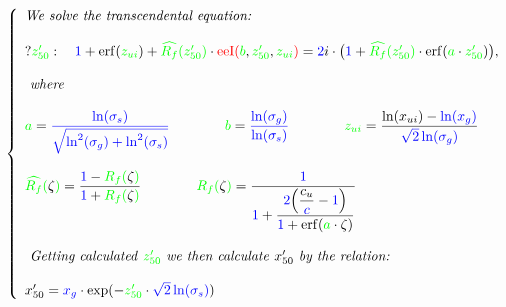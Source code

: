 \documentclass[12pt,reqno,intlimits,twoside]{amsart}
\DeclareMathOperator{\erf}{erf}%
\DeclareMathOperator{\eeI}{eeI}%
\begin{document}
\begin{equation}\label{EqXred50XuiCuC}  %
   \left\{
   \begin{array}{l}
      \text{\emph{We solve the transcendental equation:}}\\
      \phantom{\strut}\\
      ?\textcolor{green}{z'_{50}}:\quad%
      \textcolor{blue}{1} +
      \erf(\textcolor{green}{z_{ui}}) +
      \textcolor{green}{\widehat{R_f}(z'_{50})}\cdot
      \textcolor{red}{\eeI(}\textcolor{green}{b}, \textcolor{green}{z'_{50}}, \textcolor{green}{z_{ui}}
      \textcolor{red}{)} =
      \textcolor{blue}{2}i\cdot
      \big(\textcolor{blue}{1} +
           \textcolor{green}{\widehat{R_f}(z'_{50})}\cdot
           \erf(\textcolor{green}{a}\cdot \textcolor{green}{z'_{50}})
      \big),\\
      \phantom{\strut}\\
      \text{\emph{ where}}\\
      \phantom{\strut}\\
      \textcolor{green}{a} =
      \textcolor{blue}{\dfrac{\ln(\sigma_s)}{\sqrt{\ln^2(\sigma_g) + \ln^2(\sigma_s)}}}\qquad\qquad
      \textcolor{green}{b} =
      \textcolor{blue}{\dfrac{\ln(\sigma_g)}{\ln(\sigma_s)}}\qquad\qquad
      \textcolor{green}{z_{ui}} =
      \dfrac{\ln(x_{ui}) - \textcolor{blue}{\ln(x_g)}}{\textcolor{blue}{\sqrt{2}\ln(\sigma_g)}}\\
      \phantom{\strut}\\
      \textcolor{green}{\widehat{R_f}(}\zeta\textcolor{green}{)} =
      \dfrac{\textcolor{blue}{1} - \textcolor{green}{R_f(}\zeta\textcolor{green}{)}}%
            {\textcolor{blue}{1} + \textcolor{green}{R_f(}\zeta\textcolor{green}{)}}
      \qquad\qquad
      \textcolor{green}{R_f(}\zeta\textcolor{green}{)} =
      \dfrac{\textcolor{blue}{1}}%
            {\textcolor{blue}{1} +
             \dfrac{\textcolor{blue}{2}\Big(\dfrac{c_u}{\textcolor{blue}{c}} - \textcolor{blue}{1}\Big)}%
                   {\textcolor{blue}{1} + \erf(\textcolor{green}{a} \cdot \zeta)}%
            }\\
      \phantom{\strut}\\
      \text{\emph{ Getting calculated }} \textcolor{green}{z'_{50}}
      \text{\emph{ we then calculate }} x'_{50}
      \text{\emph{ by the relation: }}\\
      \phantom{\strut}\\
      x'_{50} = \textcolor{blue}{x_g}\cdot\exp(-\textcolor{green}{z'_{50}} \cdot \textcolor{blue}{\sqrt{2}\ln(\sigma_s)})
      \end{array}
   \right.
\end{equation}
\end{document}
